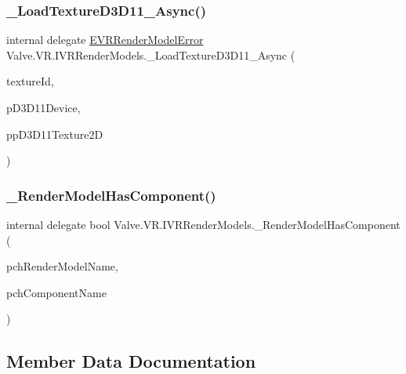 \subsubsection{\texorpdfstring{\_LoadTextureD3D11\_Async()}{\_LoadTextureD3D11\_Async()}}
{\footnotesize\ttfamily internal delegate \mbox{\hyperlink{namespace_valve_1_1_v_r_ac95dda09bbb588fd83a8ac0ba3c82266}{E\+V\+R\+Render\+Model\+Error}} Valve.\+V\+R.\+I\+V\+R\+Render\+Models.\+\_\+\+Load\+Texture\+D3\+D11\+\_\+\+Async (\begin{DoxyParamCaption}\item[{int}]{texture\+Id,  }\item[{Int\+Ptr}]{p\+D3\+D11\+Device,  }\item[{ref Int\+Ptr}]{pp\+D3\+D11\+Texture2D }\end{DoxyParamCaption})}

\mbox{\label{struct_valve_1_1_v_r_1_1_i_v_r_render_models_ae4724e8f8a0a8d43df490e731a70307c}} 
\subsubsection{\texorpdfstring{\_RenderModelHasComponent()}{\_RenderModelHasComponent()}}
{\footnotesize\ttfamily internal delegate bool Valve.\+V\+R.\+I\+V\+R\+Render\+Models.\+\_\+\+Render\+Model\+Has\+Component (\begin{DoxyParamCaption}\item[{string}]{pch\+Render\+Model\+Name,  }\item[{string}]{pch\+Component\+Name }\end{DoxyParamCaption})}



\subsection{Member Data Documentation}
\mbox{\label{struct_valve_1_1_v_r_1_1_i_v_r_render_models_ad09b53c1abe23e37e1ae6b75349ccfd8}} 
